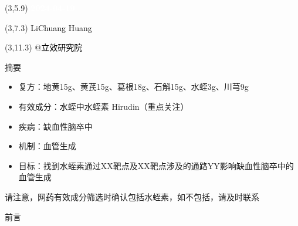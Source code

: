 \documentclass[
  ignorenonframetext,
]{beamer}
\author{}
\date{\vspace{-2.5em}}
\providecommand{\tightlist}{%
  \setlength{\itemsep}{0pt}\setlength{\parskip}{0pt}}
\begin{document}
\begin{frame}
\begin{titlepage} 
\begin{center} \textbf{\Huge } \vspace{4em}
\begin{textblock}{10}(3,5.9) \huge
\textbf{\textcolor{white}{2024-04-19}}
\end{textblock} \begin{textblock}{10}(3,7.3)
\Large \textcolor{black}{LiChuang Huang}
\end{textblock} \begin{textblock}{10}(3,11.3)
\Large \textcolor{black}{@立效研究院}
\end{textblock} \end{center} \end{titlepage}
\restoregeometry


\tableofcontents

\listoffigures

\listoftables



\end{frame}

\begin{frame}{摘要}
\protect\hypertarget{abstract}{}
\begin{itemize}
\tightlist
\item
  复方：地黄15g、黄芪15g、葛根18g、石斛15g、水蛭3g、川芎9g
\item
  有效成分：水蛭中水蛭素 Hirudin（重点关注）
\item
  疾病：缺血性脑卒中
\item
  机制：血管生成
\item
  目标：找到水蛭素通过XX靶点及XX靶点涉及的通路YY影响缺血性脑卒中的血管生成
\end{itemize}

请注意，网药有效成分筛选时确认包括水蛭素，如不包括，请及时联系
\end{frame}

\begin{frame}{前言}
\protect\hypertarget{introduction}{}
\end{frame}
\end{document}

